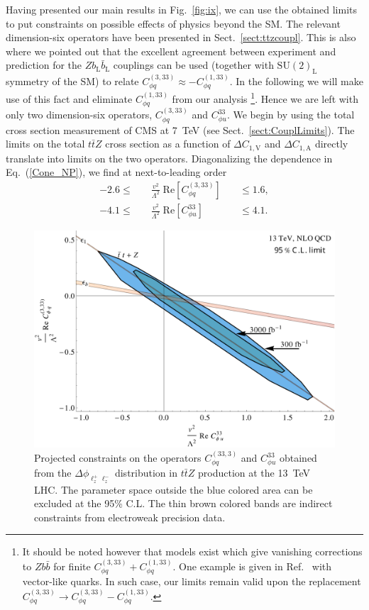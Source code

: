 \documentclass{JHEP3}
\def\ttbZ{t\bar{t}Z}
\def\DConeA{\Delta C_{1,\mathrm{A}}}
\def\DConeV{\Delta C_{1,\mathrm{V}}}
\newcommand{\be}{\begin{eqnarray}}
\newcommand{\ee}{\end{eqnarray}}
\begin{document}
Having presented our main results in Fig.~\ref{fig:ix}, we can use the obtained limits to put constraints on 
possible effects of physics beyond the SM. 
The relevant dimension-six operators have been presented in Sect.~\ref{sect:ttzcoupl}.
This is also where we pointed out that the excellent agreement between experiment and prediction
for the $Z b_\mathrm{L} \bar{b}_\mathrm{L}$ couplings can be used 
(together with $\mathrm{SU(2)_L}$ symmetry of the SM) to relate $C^{(3,33)}_{\phi q} \approx - C^{(1,33)}_{\phi q}$.
In the following we will make use of this fact and eliminate $C^{(1,33)}_{\phi q}$ from our analysis
\footnote{It should be noted however that models exist which give vanishing corrections to $Zb\bar{b}$ for finite $C^{(3,33)}_{\phi q} + C^{(1,33)}_{\phi q}$. 
One example is given in Ref.~\cite{delAguila:2000rc} with vector-like quarks. In such case, our limits remain valid upon the 
replacement $C^{(3,33)}_{\phi q} \to C^{(3,33)}_{\phi q} -C^{(1,33)}_{\phi q} $.}.
Hence we are left with only two dimension-six operators, $C^{(3,33)}_{\phi q}$ and $C^{33}_{\phi u}$.
We begin by using the total cross section measurement of CMS at 7~TeV (see Sect.~\ref{sect:CouplLimits}). 
The limits on the total $\ttbZ$ cross section as a function of $\DConeV$ and $\DConeA$ directly
translate into limits on the two operators. 
Diagonalizing the dependence in Eq.~(\ref{Cone_NP}), we find at next-to-leading order
\be
  -2.6
  \le & \quad \frac{v^2}{\Lambda^2} \;  \mathrm{Re} \left[ C^{(3,33)}_{\phi q} \right]  \quad 
  &\le 
  1.6,
  \nonumber \\
  -4.1
  \le & \quad \frac{v^2}{\Lambda^2} \;  \mathrm{Re} \left[ C^{33}_{\phi u} \right]  \quad 
  &\le
  4.1. 
\ee
% 
\begin{figure}[t]
\centering
\includegraphics[scale=0.43]{OPLimitNLO.pdf} 
\caption{\label{fig:x} Projected constraints on the operators $C^{(33,3)}_{\phi q}$ and $C^{33}_{\phi u}$
obtained from the $\Delta \phi_{\ell^+_z \ell^-_z}$ distribution in $\ttbZ$ production at the 13~TeV LHC. 
The parameter space outside the blue colored area can be excluded at the 95\% C.L.
The thin brown colored bands are indirect constraints from electroweak precision data.
}
\end{figure}
\end{document}
